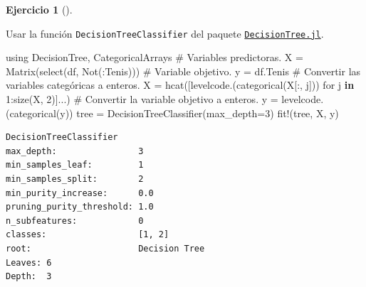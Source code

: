 \documentclass[
  a4paper,
]{scrreport}
\newenvironment{Shaded}{\begin{snugshade}}{\end{snugshade}}
\newcommand{\BuiltInTok}[1]{\textcolor[rgb]{0.00,0.23,0.31}{#1}}
\newcommand{\CommentTok}[1]{\textcolor[rgb]{0.37,0.37,0.37}{#1}}
\newcommand{\FloatTok}[1]{\textcolor[rgb]{0.68,0.00,0.00}{#1}}
\newcommand{\FunctionTok}[1]{\textcolor[rgb]{0.28,0.35,0.67}{#1}}
\newcommand{\ImportTok}[1]{\textcolor[rgb]{0.00,0.46,0.62}{#1}}
\newcommand{\KeywordTok}[1]{\textcolor[rgb]{0.00,0.23,0.31}{\textbf{#1}}}
\newcommand{\NormalTok}[1]{\textcolor[rgb]{0.00,0.23,0.31}{#1}}
\newcommand{\OperatorTok}[1]{\textcolor[rgb]{0.37,0.37,0.37}{#1}}
\theoremstyle{definition}
\newtheorem{exercise}{Ejercicio}[chapter]
\theoremstyle{remark}
\begin{document}
\begin{exercise}[]
\begin{enumerate}
\begin{tcolorbox}
  Usar la función \texttt{DecisionTreeClassifier} del paquete
  \href{https://docs.juliahub.com/DecisionTree/}{\texttt{DecisionTree.jl}}.

  \end{tcolorbox}

  \begin{tcolorbox}[enhanced jigsaw, toptitle=1mm, colframe=quarto-callout-tip-color-frame, titlerule=0mm, left=2mm, arc=.35mm, colbacktitle=quarto-callout-tip-color!10!white, opacityback=0, bottomtitle=1mm, toprule=.15mm, coltitle=black, breakable, colback=white, rightrule=.15mm, opacitybacktitle=0.6, leftrule=.75mm, bottomrule=.15mm, title=\textcolor{quarto-callout-tip-color}{\faLightbulb}\hspace{0.5em}{Solución}]

\begin{Shaded}
\begin{Highlighting}[]
\ImportTok{using} \BuiltInTok{DecisionTree}\NormalTok{, }\BuiltInTok{CategoricalArrays}
\CommentTok{\# Variables predictoras.}
\NormalTok{X }\OperatorTok{=} \FunctionTok{Matrix}\NormalTok{(}\FunctionTok{select}\NormalTok{(df, }\FunctionTok{Not}\NormalTok{(}\OperatorTok{:}\NormalTok{Tenis)))}
\CommentTok{\# Variable objetivo.}
\NormalTok{y }\OperatorTok{=}\NormalTok{ df.Tenis}
\CommentTok{\# Convertir las variables categóricas a enteros.}
\NormalTok{X }\OperatorTok{=} \FunctionTok{hcat}\NormalTok{([}\FunctionTok{levelcode}\NormalTok{.(}\FunctionTok{categorical}\NormalTok{(X[}\OperatorTok{:}\NormalTok{, j])) for j }\KeywordTok{in} \FloatTok{1}\OperatorTok{:}\FunctionTok{size}\NormalTok{(X, }\FloatTok{2}\NormalTok{)]}\OperatorTok{...}\NormalTok{)}
\CommentTok{\# Convertir la variable objetivo a enteros.}
\NormalTok{y }\OperatorTok{=} \FunctionTok{levelcode}\NormalTok{.(}\FunctionTok{categorical}\NormalTok{(y))}
\NormalTok{tree }\OperatorTok{=} \FunctionTok{DecisionTreeClassifier}\NormalTok{(max\_depth}\OperatorTok{=}\FloatTok{3}\NormalTok{)}
\FunctionTok{fit!}\NormalTok{(tree, X, y)}
\end{Highlighting}
\end{Shaded}

\begin{verbatim}
DecisionTreeClassifier
max_depth:                3
min_samples_leaf:         1
min_samples_split:        2
min_purity_increase:      0.0
pruning_purity_threshold: 1.0
n_subfeatures:            0
classes:                  [1, 2]
root:                     Decision Tree
Leaves: 6
Depth:  3
\end{verbatim}


\end{tcolorbox}
\end{enumerate}
\end{exercise}
\end{document}
